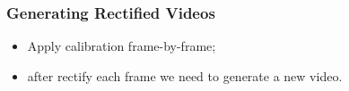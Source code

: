 \documentclass{beamer}
\begin{document}
		\begin{frame}\frametitle{Generating Rectified Videos}
			\begin{itemize}
				\item Apply calibration frame-by-frame;
				\item after rectify each frame we need to generate a new video.



			 \end{itemize}
			 \begin{figure}[htb!]
				\center
				\label{fig:undistort}
			\end{figure}

		\end{frame}
\end{document}
